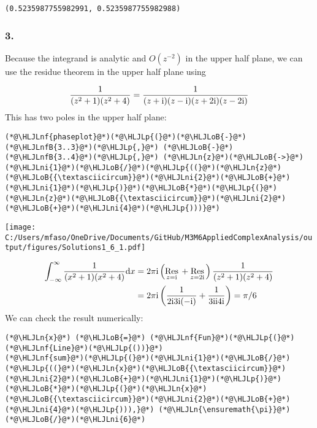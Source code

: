 \documentclass[12pt,a4paper]{article}
\newcommand{\HLJLn}[1]{#1}
\newcommand{\HLJLnf}[1]{\textcolor[RGB]{66,102,213}{#1}}
\newcommand{\HLJLnfB}[1]{\textcolor[RGB]{59,151,46}{#1}}
\newcommand{\HLJLni}[1]{\textcolor[RGB]{59,151,46}{#1}}
\newcommand{\HLJLoB}[1]{\textcolor[RGB]{102,102,102}{\textbf{#1}}}
\newcommand{\HLJLp}[1]{#1}
\def\D{ {\rm d} }
\def\I{ {\rm i} }
\def\Res_#1{\underset{#1}{\rm Res}\,}
\def\dx{\D x}
\begin{document}
\begin{lstlisting}
(0.5235987755982991, 0.5235987755982988)
\end{lstlisting}


\subsubsection{3.}
Because the integrand is analytic  and $O(z^{-2})$ in the upper half plane, we can use the residue theorem in the upper half plane using

\[
 {1 \over (z^2+1) (z^2 + 4)} = {1 \over (z+\I)(z-\I) (z+2\I)(z-2\I)}
\]
This has two poles in the upper half plane:


\begin{lstlisting}
(*@\HLJLnf{phaseplot}@*)(*@\HLJLp{(}@*)(*@\HLJLoB{-}@*)(*@\HLJLnfB{3..3}@*)(*@\HLJLp{,}@*) (*@\HLJLoB{-}@*)(*@\HLJLnfB{3..4}@*)(*@\HLJLp{,}@*) (*@\HLJLn{z}@*)(*@\HLJLoB{->}@*) (*@\HLJLni{1}@*)(*@\HLJLoB{/}@*)(*@\HLJLp{((}@*)(*@\HLJLn{z}@*)(*@\HLJLoB{{\textasciicircum}}@*)(*@\HLJLni{2}@*)(*@\HLJLoB{+}@*)(*@\HLJLni{1}@*)(*@\HLJLp{)}@*)(*@\HLJLoB{*}@*)(*@\HLJLp{(}@*)(*@\HLJLn{z}@*)(*@\HLJLoB{{\textasciicircum}}@*)(*@\HLJLni{2}@*)(*@\HLJLoB{+}@*)(*@\HLJLni{4}@*)(*@\HLJLp{)))}@*)
\end{lstlisting}

\texttt{[image: C:/Users/mfaso/OneDrive/Documents/GitHub/M3M6AppliedComplexAnalysis/output/figures/Solutions1\_6\_1.pdf]}


\begin{align*}
	\int_{-\infty}^\infty    {1 \over (x^2+1)(x^2+4)} \dx &=
    2 \pi \I \left( \Res_{z = \I} + \Res_{z = 2\I}\right){1 \over (z^2+1)(z^2+4)} \\
    & = 2 \pi \I \left( {1 \over 2 \I 3 \I (-\I)} + {1 \over 3 \I  \I 4\I} \right) = \pi/ 6
\end{align*}
We can check the result numerically:


\begin{lstlisting}
(*@\HLJLn{x}@*) (*@\HLJLoB{=}@*) (*@\HLJLnf{Fun}@*)(*@\HLJLp{(}@*) (*@\HLJLnf{Line}@*)(*@\HLJLp{())}@*)
(*@\HLJLnf{sum}@*)(*@\HLJLp{(}@*)(*@\HLJLni{1}@*)(*@\HLJLoB{/}@*)(*@\HLJLp{((}@*)(*@\HLJLn{x}@*)(*@\HLJLoB{{\textasciicircum}}@*)(*@\HLJLni{2}@*)(*@\HLJLoB{+}@*)(*@\HLJLni{1}@*)(*@\HLJLp{)}@*)(*@\HLJLoB{*}@*)(*@\HLJLp{(}@*)(*@\HLJLn{x}@*)(*@\HLJLoB{{\textasciicircum}}@*)(*@\HLJLni{2}@*)(*@\HLJLoB{+}@*)(*@\HLJLni{4}@*)(*@\HLJLp{))),}@*) (*@\HLJLn{\ensuremath{\pi}}@*)(*@\HLJLoB{/}@*)(*@\HLJLni{6}@*)
\end{lstlisting}
\end{document}
